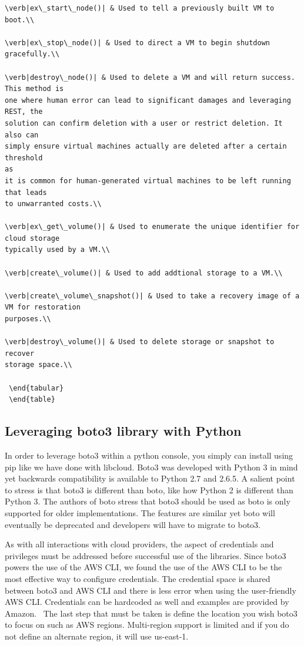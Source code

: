 \begin{verbatim}
\verb|ex\_start\_node()| & Used to tell a previously built VM to boot.\\

\verb|ex\_stop\_node()| & Used to direct a VM to begin shutdown gracefully.\\

\verb|destroy\_node()| & Used to delete a VM and will return success. This method is
one where human error can lead to significant damages and leveraging REST, the
solution can confirm deletion with a user or restrict deletion. It also can
simply ensure virtual machines actually are deleted after a certain threshold
as
it is common for human-generated virtual machines to be left running that leads
to unwarranted costs.\\

\verb|ex\_get\_volume()| & Used to enumerate the unique identifier for cloud storage
typically used by a VM.\\

\verb|create\_volume()| & Used to add addtional storage to a VM.\\

\verb|create\_volume\_snapshot()| & Used to take a recovery image of a VM for restoration
purposes.\\

\verb|destroy\_volume()| & Used to delete storage or snapshot to recover
storage space.\\

 \end{tabular}
 \end{table}
\end{verbatim}

\subsection{Leveraging boto3 library with Python}

In order to leverage boto3 within a python console, you simply can install
using
pip like we have done with libcloud. Boto3 was developed with Python 3 in mind
yet backwards compatibility is available to Python 2.7 and 2.6.5. A salient
point to stress is that boto3 is different than boto, like how Python 2 is
different than Python 3. The authors of boto stress that boto3 should be used
as
boto is only supported for older implementations. The features are similar yet
boto will eventually be deprecated and developers will have to migrate to
boto3.~\cite{hid-sp18-518-AWS-boto3}

As with all interactions with cloud providers, the aspect of credentials and
privileges must be addressed before successful use of the libraries. Since
boto3
powers the use of the AWS CLI, we found the use of the AWS CLI to be the most
effective way to configure credentials. The credential space is shared between
boto3 and AWS CLI and there is less error when using the user-friendly AWS CLI.
Credentials can be hardcoded as well and examples are provided by
Amazon.~\cite{hid-sp18-518-Boto3} The last step that must be taken is define
the
location you wish boto3 to focus on such as AWS regions. Multi-region support
is
limited and if you do not define an alternate region, it will use us-east-1.

